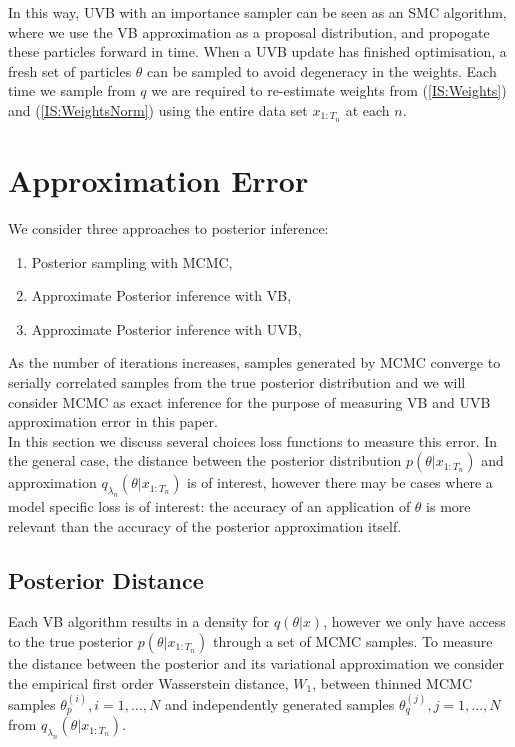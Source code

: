 \documentclass[12pt,a4paper]{article}\usepackage[]{graphicx}\usepackage[]{color}
\begin{document}
In this way, UVB with an importance sampler can be seen as an SMC algorithm, where we use the VB approximation as a proposal distribution, and propogate these particles forward in time. When a UVB update has finished optimisation, a fresh set of particles $\theta$ can be sampled to avoid degeneracy in the weights. Each time we sample from $q$ we are required to re-estimate weights from (\ref{IS:Weights}) and (\ref{IS:WeightsNorm}) using the entire data set $x_{1:T_n}$ at each $n$.
\\

\section{Approximation Error}

We consider three approaches to posterior inference:
\begin{enumerate}
\item Posterior sampling with MCMC,
\item Approximate Posterior inference with VB,
\item Approximate Posterior inference with UVB,
\end{enumerate}

As the number of iterations increases, samples generated by MCMC converge to serially correlated samples from the true posterior distribution and we will consider MCMC as exact inference for the purpose of measuring VB and UVB approximation error in this paper.
\\

In this section we discuss several choices loss functions to measure this error. In the general case, the distance between the posterior distribution $p(\theta | x_{1:T_n})$ and approximation $q_{\lambda_n}(\theta |  x_{1:T_n})$ is of interest, however there may be cases where a model specific loss is of interest: the accuracy of an application of $\theta$ is more relevant than the accuracy of the posterior approximation itself. 


\subsection{Posterior Distance}

Each VB algorithm results in a density for $q(\theta | x)$, however we only have access to the true posterior $p(\theta | x_{1:T_n})$ through a set of MCMC samples. To measure the distance between the posterior and its variational approximation we consider the empirical first order Wasserstein distance, $W_1$, between thinned MCMC samples $\theta^{(i)}_p, i = 1, \dots, N$ and independently generated samples $\theta^{(j)}_q, j = 1, \dots, N$ from $q_{\lambda_n}(\theta |  x_{1:T_n})$.
\\
\end{document}
